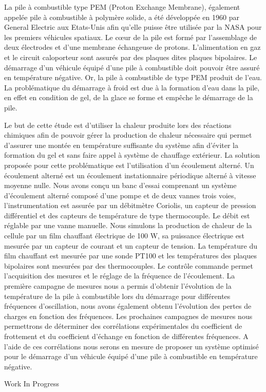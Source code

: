 {\normalsize
La pile à combustible type PEM (Proton Exchange Membrane), également appelée pile à combustible à polymère solide, a été développée en 1960 par General Electric aux Etats-Unis afin qu’elle puisse être utilisée par la NASA pour les premiers véhicules spatiaux. Le cœur de la pile est formé par l’assemblage de deux électrodes et d’une membrane échangeuse de protons. L’alimentation en gaz et le circuit caloporteur sont assurés par des plaques dites plaques bipolaires. Le démarrage d’un véhicule équipé d’une pile à combustible doit pouvoir être assuré en température négative. Or, la pile à combustible de type PEM produit de l’eau. La problématique du démarrage à froid est due à la formation d’eau dans la pile, en effet en condition de gel, de la glace se forme et empêche le démarrage de la pile.

Le but de cette étude est d’utiliser la chaleur produite lors des réactions chimiques afin de pouvoir gérer la production de chaleur nécessaire qui permet d’assurer une montée en température suffisante du système afin d’éviter la formation du gel et sans faire appel à système de chauffage extérieur. La solution proposée pour cette problématique est l’utilisation d’un écoulement alterné. Un écoulement alterné est un écoulement instationnaire périodique alterné à vitesse moyenne nulle. Nous avons conçu un banc d’essai comprenant un système d’écoulement alterné composé d’une pompe et de deux vannes trois voies, l’instrumentation est assurée par un débitmètre Coriolis, un capteur de pression différentiel et des capteurs de température de type thermocouple. Le débit est réglable par une vanne manuelle.  Nous simulons la production de chaleur de la cellule par un film chauffant électrique de 100 W, sa puissance électrique est mesurée par un capteur de courant et un capteur de tension. La température du film chauffant est mesurée par une sonde PT100 et les températures des plaques bipolaires sont mesurées par des thermocouples. Le contrôle commande permet l’acquisition des mesures et le réglage de la fréquence de l’écoulement. La première campagne de mesures nous a permis d’obtenir l’évolution de la température de la pile à combustible lors du démarrage pour différentes fréquences d’oscillation, nous avons également obtenu l’évolution des pertes de charges en fonction des fréquences. Les prochaines campagnes de mesures nous permettrons de déterminer des corrélations expérimentales du coefficient de frottement et du coefficient d’échange en fonction de différentes fréquences. A l’aide de ces corrélations nous serons en mesure de proposer un système optimisé pour le démarrage d’un véhicule équipé d’une pile à combustible en température négative.

 \vfill Work In Progress

}
 

